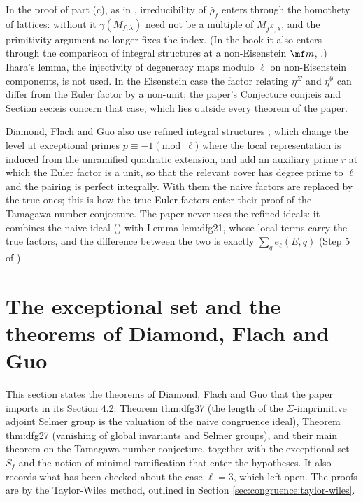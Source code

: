 \begin{remark}\label{rem:congruence:ihara}
In the proof of part (c), as in \cite{DFG04}, irreducibility of $\bar\rho_f$ enters through the homothety of lattices: without it $\gamma(M_{f,\lambda})$ need not be a multiple of
$M_{f^\Sigma,\lambda}$, and the primitivity argument no longer fixes the index. (In the book it also enters through the comparison of integral structures at a non-Eisenstein $\mf m$,
.) Ihara's lemma, the injectivity of degeneracy maps modulo $\ell$ on non-Eisenstein components, is not used. In the Eisenstein case the factor relating $\eta^\Sigma$ and $\eta^\emptyset$ can differ from the Euler factor by a non-unit; the paper's Conjecture conj:eis and
Section sec:eis concern that case, which lies outside every theorem of the paper.
\end{remark}

\begin{remark}\label{rem:congruence:refined-structures}
Diamond, Flach and Guo also use refined integral structures \cite[Section 1.8]{DFG04}, which change the level at exceptional primes $p\equiv-1\pmod\ell$ where the local
representation is induced from the unramified quadratic extension, and add an auxiliary prime $r$ at which the Euler factor is a unit, so that the relevant cover has degree
prime to $\ell$ and the pairing is perfect integrally. With them the naive factors are replaced by the true ones; this is how the true Euler factors enter their proof of
the Tamagawa number conjecture. The paper never uses the refined ideals: it combines the naive ideal () with Lemma lem:dfg21, whose local terms carry the
true factors, and the difference between the two is exactly $\sum_qe_\ell(E,q)$ (Step 5 of ).
\end{remark}

\section[The exceptional set and the theorems of DFG]{The exceptional set and the theorems of Diamond, Flach and Guo}\label{sec:congruence:dfg-theorems}

This section states the theorems of Diamond, Flach and Guo that the paper imports in its Section 4.2: Theorem thm:dfg37 (the length of the $\Sigma$-imprimitive
adjoint Selmer group is the valuation of the naive congruence ideal), Theorem thm:dfg27 (vanishing of global invariants and Selmer groups), and their main theorem on the
Tamagawa number conjecture, together with the exceptional set $S_f$ and the notion of minimal ramification that enter the hypotheses. It also records what has been checked
about the case $\ell=3$, which  left open. The proofs are by the Taylor-Wiles method, outlined in Section \ref{sec:congruence:taylor-wiles}.

